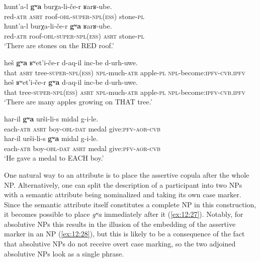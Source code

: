 ﻿\documentclass[output=paper]{langsci/langscibook}
\begin{document}
\ea \label{ex:12:24} %
\ea %
\gll *ħunt'a-l \textbf{gʷa} burχa-li-če-r ʁarʁ-ube.\\
red-\textsc{atr} \textsc{asrt} roof-\textsc{obl}-\textsc{super}-\textsc{npl}(\textsc{ess}) stone-\textsc{pl}\\

\ex %
\gll ħunt'a-l burχa-li-če-r \textbf{gʷa} ʁarʁ-ube.\\
red-\textsc{atr} roof-\textsc{obl}-\textsc{super}-\textsc{npl}(\textsc{ess}) \textsc{asrt} stone-\textsc{pl}\\
\glt `There are stones on the RED roof.'
\z

\ex \label{ex:12:25} %
\ea %
\gll *heš \textbf{gʷa} ʁʷet'i-če-r d-aq-il inc-be d-urh-uwe.\\
that \textsc{asrt} tree-\textsc{super}-\textsc{npl}(\textsc{ess}) \textsc{npl}-much-\textsc{atr} apple-\textsc{pl} \textsc{npl}-become:\textsc{ipfv}-\textsc{cvb.ipfv}\\

\ex %
\gll heš ʁʷet'i-če-r \textbf{gʷa} d-aq-il inc-be d-urh-uwe.\\
that tree-\textsc{super}-\textsc{npl}(\textsc{ess}) \textsc{asrt} \textsc{npl}-much-\textsc{atr} apple-\textsc{pl} \textsc{npl}-become:\textsc{ipfv}-\textsc{cvb.ipfv}\\
\glt `There are many apples growing on THAT tree.'
\z

\ex \label{ex:12:26} %
\ea %
\gll *har-il \textbf{gʷa} urši-li-s midal g-i-le.\\
each-\textsc{atr} \textsc{asrt} boy-\textsc{obl}-\textsc{dat} medal give:\textsc{pfv}-\textsc{aor}-\textsc{cvb}\\

\ex %
\gll har-il urši-li-s \textbf{gʷa} midal g-i-le.\\
each-\textsc{atr} boy-\textsc{obl}-\textsc{dat} \textsc{asrt} medal give:\textsc{pfv}-\textsc{aor}-\textsc{cvb}\\
\glt `He gave a medal to EACH boy.'
\z
\z


One natural way to  an attribute is to place the assertive copula
after the whole NP. Alternatively, one can split the description of a
participant into two NPs with a semantic attribute being nominalized and
taking its own case marker. Since the semantic attribute itself
constitutes a complete NP in this construction, it becomes possible to
place \emph{gʷa} immediately after it (\ref{ex:12:27}). Notably, for absolutive NPs
this results in the illusion of the embedding of the assertive marker in
an NP (\ref{ex:12:28}), but this is likely to be a consequence of the fact that
absolutive NPs do not receive overt case marking, so the two adjoined
absolutive NPs look as a single phrase.
\end{document}
